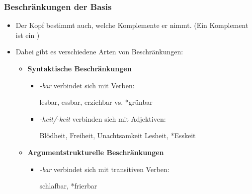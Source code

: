 \begin{frame}
\frametitle{Beschränkungen der Basis}

\begin{itemize}
	\item Der Kopf bestimmt auch, welche Komplemente er nimmt. (Ein Komplement ist ein )
	\item Dabei gibt es verschiedene Arten von Beschränkungen:

\vspace{1em}
	
	\begin{itemize}
		\item \textbf{Syntaktische Beschränkungen}
		
		\begin{itemize}
			\item \textit{-bar} verbindet sich mit Verben:
			
			\ea lesbar, essbar, erziehbar vs. *grünbar
			\z
			
			\item \textit{-heit/-keit} verbinden sich mit Adjektiven:		
			
			\ea Blödheit, Freiheit, Unachtsamkeit \vs *Lesheit, *Esskeit
			\z
			
		\end{itemize}
		
	\item \textbf{Argumentstrukturelle Beschränkungen}
	
		\begin{itemize}
			\item \textit{-bar} verbindet sich mit transitiven Verben:	
			
			\ea *schlafbar, *frierbar
			\z
			
		\end{itemize}
		
	\end{itemize}
	
\end{itemize}


\end{frame}





